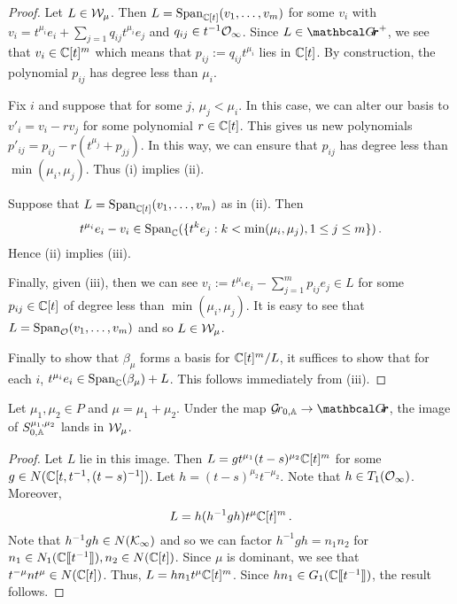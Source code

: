 \documentclass[draft]{article}
\begin{document}
\begin{proof}
    Let $ L \in \cW_\mu$.  Then $ L = \Sp_{\CC[t]}(v_1, \dots, v_m) $ for some $ v_i $ with $ v_i = t^{\mu_i} e_i + \sum_{j=1} q_{ij}t^{\mu_i} e_j $ and $ q_{ij} \in t^{-1} \Oinf$.  Since $ L \in \Grth^+ $, we see that $ v_i \in \CC[t]^m$ which means that $ p_{ij} := q_{ij}t^{\mu_i} $ lies in $ \CC[t]$.  By construction, the polynomial $ p_{ij}$ has degree less than $ \mu_i$.
    
    Fix $ i$ and suppose that for some $ j$, $ \mu_j < \mu_i$.  In this case, we can alter our basis to $ v'_i = v_i - r v_j$ for some polynomial $r \in \CC[t]$.  This gives us new polynomials $ p'_{ij} = p_{ij} - r (t^{\mu_j} + p_{jj}) $.  In this way, we can ensure that $ p_{ij} $ has degree less than $ \min(\mu_i, \mu_j)$.  Thus (i) implies (ii).
    
    Suppose that $ L = \Sp_{\CC[t]}(v_1, \dots, v_m)$ as in (ii).  Then
    $$t^{\mu_i} e_i - v_i \in \Sp_\CC(\{t^k e_j :  k < \min(\mu_i, \mu_j), 1 \le j \le m \})  \,. $$
    Hence (ii) implies (iii).  

    Finally, given (iii), then we can see $ v_i := t^{\mu_i} e_i - \sum_{j=1}^m p_{ij} e_j \in L $ for some $ p_{ij} \in \CC[t]$ of degree less than $ \min(\mu_i,\mu_j) $.  It is easy to see that $ L = \Sp_\cO(v_1, \dots, v_m) $ and so $ L \in \cW_\mu$.  
    
    Finally to show that $ \beta_\mu$ forms a basis for $ \CC[t]^m/L$, it suffices to show that for each $ i$, $ t^{\mu_i} e_i  \in \Sp_\CC(\beta_\mu) + L$.  This follows immediately from (iii).
    \end{proof}

\begin{lemma}
    Let $\mu_1,\mu_2 \in P$ and $\mu = \mu_1 + \mu_2$. Under the map $ \Grbd \rightarrow \Grth$, the image of $ S^{\mu_1, \mu_2}_{0,\AA}$ lands in $ \cW_\mu$.
\end{lemma}

\begin{proof}
    Let $ L $ lie in this image.  Then $ L = g t^{\mu_1} (t-s)^{\mu_2}\CC[t]^m$ for some $ g \in N(\CC[t, t^{-1}, (t-s)^{-1}]) $.  Let $ h =(t-s)^{\mu_2} t^{-\mu_2}  $.  Note that $ h \in T_1(\Oinf)$. 
    Moreover,
    $$ L = h (h^{-1} g h) t^{\mu}\CC[t]^m\,. $$
    Note that 
    $h^{-1} g h \in N(\cK_\infty)$ and so we can factor $ h^{-1} g h = n_1 n_2$ for $ n_1 \in N_1(\CC\xt[t^{-1}]), n_2 \in N(\CC[t]) $.  Since $ \mu $ is dominant, we see that $ t^{-\mu} n t^\mu \in N(\CC[t]) $.  Thus, $ L = h n_1 t^\mu \CC[t]^m$.  Since $ hn_1 \in G_1(\CC\xt[t^{-1}])$, the result follows.
    \end{proof}
\end{document}
